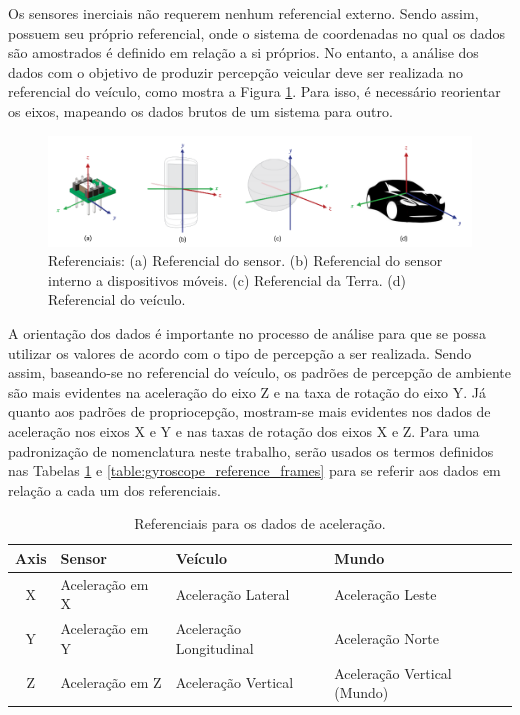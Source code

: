 Os sensores inerciais não requerem nenhum referencial externo. Sendo assim, possuem seu próprio referencial, onde o sistema de coordenadas no qual os dados são amostrados é definido em relação a si próprios. No entanto, a análise dos dados com o objetivo de produzir percepção veicular deve ser realizada no referencial do veículo, como mostra a Figura \ref{fig:quadros_referencia}. Para isso, é necessário reorientar os eixos, mapeando os dados brutos de um sistema para outro.

\begin{figure}[h!]
  \centering
  \caption{Referenciais: (a) Referencial do sensor. (b) Referencial do sensor interno a dispositivos móveis. (c) Referencial da Terra. (d) Referencial do veículo.}
   \label{fig:quadros_referencia}
   \includegraphics[width=1\textwidth]{figuras/fig2.png}
\end{figure}

A orientação dos dados é importante no processo de análise para que se possa utilizar os valores de acordo com o tipo de percepção a ser realizada. Sendo assim, baseando-se no referencial do veículo, os padrões de percepção de ambiente são mais evidentes na aceleração do eixo Z e na taxa de rotação do eixo Y. Já quanto aos padrões de propriocepção, mostram-se mais evidentes nos dados de aceleração nos eixos X e Y e nas taxas de rotação dos eixos X e Z. Para uma padronização de nomenclatura neste trabalho, serão usados os termos definidos nas Tabelas \ref{table:accelerometer_reference_frames} e \ref{table:gyroscope_reference_frames} para se referir aos dados em relação a cada um dos referenciais.

\begin{table}[h!]
    \caption{Referenciais para os dados de aceleração.}
    \label{table:accelerometer_reference_frames}
    \centering
    \begin{tabular}{clll}
        \toprule
        \textbf{Axis} & \textbf{Sensor} & \textbf{Veículo} & \textbf{Mundo} \\
        \toprule
        X & Aceleração em X & Aceleração Lateral & Aceleração Leste \\
        \midrule
        Y & Aceleração em Y & Aceleração Longitudinal & Aceleração Norte \\
        \midrule
        Z & Aceleração em Z & Aceleração Vertical & Aceleração Vertical (Mundo) \\
        \bottomrule
    \end{tabular}
\end{table}

